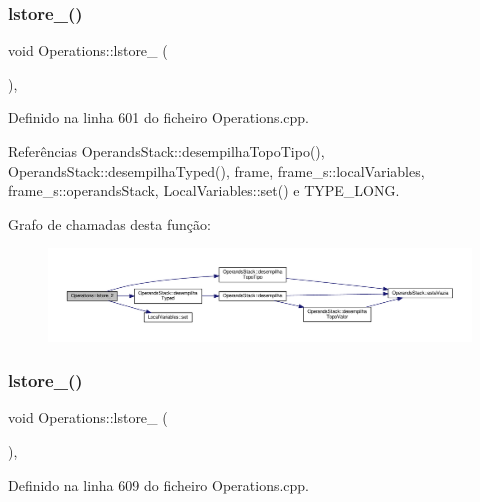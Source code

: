 \subsubsection{\texorpdfstring{lstore\+\_()}{lstore\_2()}}
{\footnotesize\ttfamily void Operations\+::lstore\+\_ (\begin{DoxyParamCaption}{ }\end{DoxyParamCaption})\hspace{0.3cm}{\ttfamily [static]}, {\ttfamily [private]}}



Definido na linha 601 do ficheiro Operations.\+cpp.



Referências Operands\+Stack\+::desempilha\+Topo\+Tipo(), Operands\+Stack\+::desempilha\+Typed(), frame, frame\+\_\+s\+::local\+Variables, frame\+\_\+s\+::operands\+Stack, Local\+Variables\+::set() e T\+Y\+P\+E\+\_\+\+L\+O\+NG.

Grafo de chamadas desta função\+:
\nopagebreak
\begin{figure}[H]
\begin{center}
\leavevmode
\includegraphics[width=350pt]{classOperations_a178660c2b3ca2625c140daf867531386_cgraph}
\end{center}
\end{figure}
\mbox{\label{classOperations_a00d5ca7ea5a68e9cccfdc26b11a716bf}} 
\subsubsection{\texorpdfstring{lstore\+\_()}{lstore\_3()}}
{\footnotesize\ttfamily void Operations\+::lstore\+\_ (\begin{DoxyParamCaption}{ }\end{DoxyParamCaption})\hspace{0.3cm}{\ttfamily [static]}, {\ttfamily [private]}}



Definido na linha 609 do ficheiro Operations.\+cpp.



